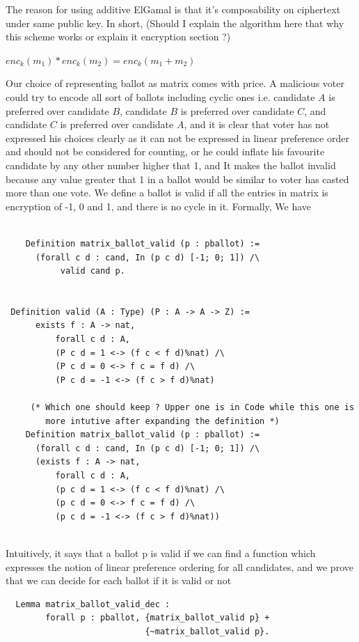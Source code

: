 \documentclass{llncs}
\begin{document}
 The reason for using additive ElGamal is that it's composability on ciphertext 
 under same public key. In short,  (Should I explain the algorithm here that 
  why this scheme works or explain it encryption section ?)
 \begin{center}  
	$enc_{k}(m_{1}) * enc_{k}(m_{2}) = enc_{k} (m_{1} + m_{2})$
 \end{center}
 Our choice of representing ballot as matrix comes with price. A malicious 
 voter could try to encode all sort of ballots including cyclic ones i.e. candidate
 $A$ is preferred over candidate $B$, candidate $B$ is preferred over candidate $C$, 
 and candidate $C$ is preferred over candidate $A$, and it is clear that voter has
 not expressed his choices clearly as it can not be expressed in linear preference order 
 and should not be considered for counting, or 
 he could inflate his favourite candidate by any other number higher that 1, and It 
 makes the ballot invalid because any value greater that 1 in a ballot would be similar
 to voter has casted more than one vote. We define a ballot is valid if all the 
 entries in matrix is encryption of -1, 0 and 1, and there is no cycle in it. Formally, We have
 \begin{verbatim}
 
	Definition matrix_ballot_valid (p : pballot) :=
      (forall c d : cand, In (p c d) [-1; 0; 1]) /\
	       valid cand p.  
 
 
 Definition valid (A : Type) (P : A -> A -> Z) :=
      exists f : A -> nat,
          forall c d : A,
          (P c d = 1 <-> (f c < f d)%nat) /\
          (P c d = 0 <-> f c = f d) /\ 
          (P c d = -1 <-> (f c > f d)%nat)
          
     (* Which one should keep ? Upper one is in Code while this one is 
        more intutive after expanding the definition *) 
    Definition matrix_ballot_valid (p : pballot) :=
      (forall c d : cand, In (p c d) [-1; 0; 1]) /\
      (exists f : A -> nat,
          forall c d : A,
          (p c d = 1 <-> (f c < f d)%nat) /\
          (p c d = 0 <-> f c = f d) /\ 
          (p c d = -1 <-> (f c > f d)%nat))
    
 \end{verbatim}
 Intuitively, it says that a ballot p is valid if we can find a function which
  expresses 
 the notion of linear preference ordering for all candidates, and 
 we prove that we can decide for each ballot if it is valid or not 
 \begin{verbatim}
  Lemma matrix_ballot_valid_dec : 
        forall p : pballot, {matrix_ballot_valid p} +
                            {~matrix_ballot_valid p}.
 \end{verbatim}
 
\end{document}

